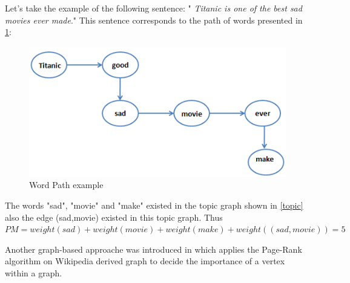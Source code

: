 \begin{itemize}
				Let's take the example of the following sentence: " \textit{Titanic is one of the best sad movies ever made}." This sentence corresponds to the path of words presented in \ref{path}: \\
				\begin{figure}[h!]
					\centering
					\includegraphics[scale=0.7]{graphics/path.PNG} 
					\caption{Word Path example} \label{path}
				\end{figure} 
					The words "sad", "movie" and "make" existed in the topic graph shown in \ref{topic} also the edge (sad,movie) existed in this topic graph. Thus $PM = weight(sad) + weight(movie)+ weight(make)+ weight((sad,movie)) = 5 $  			
				\end{itemize}
				
 
Another graph-based approache was introduced in \cite{a:wiki} which applies the Page-Rank algorithm on Wikipedia derived graph to decide the importance of a vertex within a graph. 
